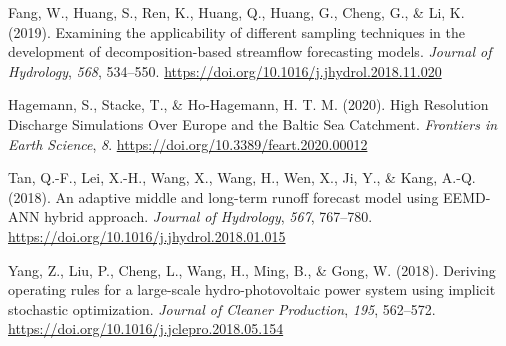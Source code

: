 \documentclass[
]{agujournal2019}
\newlength{\cslhangindent}
\newlength{\cslentryspacingunit} %
\newenvironment{CSLReferences}[2] %
 {%
  \setlength{\parindent}{0pt}
  \ifodd #1
  \let\oldpar\par
  \def\par{\hangindent=\cslhangindent\oldpar}
  \fi
  \setlength{\parskip}{#2\cslentryspacingunit}
 }%
 {}
\begin{document}
\hypertarget{refs}{}
\begin{CSLReferences}{1}{0}
\vspace{1em}

\leavevmode{}%
Fang, W., Huang, S., Ren, K., Huang, Q., Huang, G., Cheng, G., \& Li, K.
(2019). Examining the applicability of different sampling techniques in
the development of decomposition-based streamflow forecasting models.
\emph{Journal of Hydrology}, \emph{568}, 534--550.
\url{https://doi.org/10.1016/j.jhydrol.2018.11.020}

\leavevmode{}%
Hagemann, S., Stacke, T., \& Ho-Hagemann, H. T. M. (2020). High
{Resolution Discharge Simulations Over Europe} and the {Baltic Sea
Catchment}. \emph{Frontiers in Earth Science}, \emph{8}.
\url{https://doi.org/10.3389/feart.2020.00012}

\leavevmode{}%
Tan, Q.-F., Lei, X.-H., Wang, X., Wang, H., Wen, X., Ji, Y., \& Kang,
A.-Q. (2018). An adaptive middle and long-term runoff forecast model
using {EEMD-ANN} hybrid approach. \emph{Journal of Hydrology},
\emph{567}, 767--780.
\url{https://doi.org/10.1016/j.jhydrol.2018.01.015}

\leavevmode{}%
Yang, Z., Liu, P., Cheng, L., Wang, H., Ming, B., \& Gong, W. (2018).
Deriving operating rules for a large-scale hydro-photovoltaic power
system using implicit stochastic optimization. \emph{Journal of Cleaner
Production}, \emph{195}, 562--572.
\url{https://doi.org/10.1016/j.jclepro.2018.05.154}

\end{CSLReferences}
\end{document}

